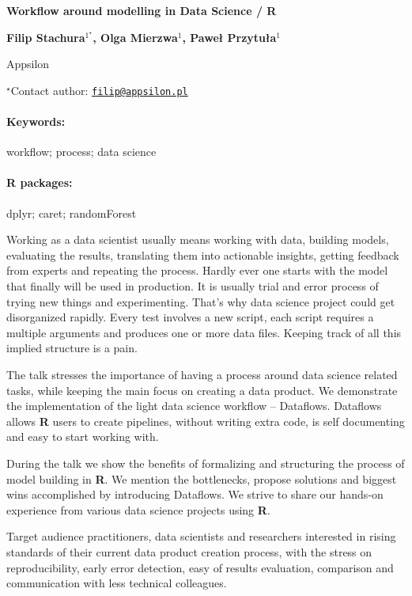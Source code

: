 \documentclass[11pt, a4paper]{article}
\renewcommand{\title}[1]{\begin{center}{\bf \LARGE #1}\end{center}}
\newcommand{\keywords}{\paragraph{Keywords:}}
\newcommand{\packages}{\paragraph{R packages:}}
\begin{document}
\pagestyle{empty}

\title{Workflow around modelling in Data Science / R}

\begin{center}
  {\bf Filip Stachura$^{1^\star}$, Olga Mierzwa$^{1}$, Paweł Przytuła$^{1}$}
\end{center}

\vskip 0.3cm

\begin{affiliations}
\begin{enumerate}
\begin{minipage}{0.915\textwidth}
\centering
\item Appsilon \\[-2pt]
\end{minipage}
\end{enumerate}
$^\star$Contact author: \href{mailto:filip@appsilon.pl}{\nolinkurl{filip@appsilon.pl}}\\
\end{affiliations}

\vskip 0.5cm

\begin{minipage}{0.915\textwidth}
\keywords workflow; process; data science
\packages dplyr; caret; randomForest
\end{minipage}

\vskip 0.8cm

Working as a data scientist usually means working with data, building
models, evaluating the results, translating them into actionable
insights, getting feedback from experts and repeating the process.
Hardly ever one starts with the model that finally will be used in
production. It is usually trial and error process of trying new things
and experimenting. That's why data science project could get
disorganized rapidly. Every test involves a new script, each script
requires a multiple arguments and produces one or more data files.
Keeping track of all this implied structure is a pain.

The talk stresses the importance of having a process around data science
related tasks, while keeping the main focus on creating a data product.
We demonstrate the implementation of the light data science workflow --
Dataflows. Dataflows allows \textbf{R} users to create pipelines,
without writing extra code, is self documenting and easy to start
working with.

During the talk we show the benefits of formalizing and structuring the
process of model building in \textbf{R}. We mention the bottlenecks,
propose solutions and biggest wins accomplished by introducing
Dataflows. We strive to share our hands-on experience from various data
science projects using \textbf{R}.

Target audience practitioners, data scientists and researchers
interested in rising standards of their current data product creation
process, with the stress on reproducibility, early error detection, easy
of results evaluation, comparison and communication with less technical
colleagues.
\end{document}

